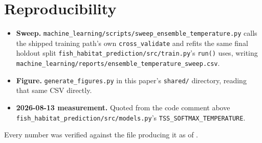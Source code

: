 \documentclass[conference]{IEEEtran}
\begin{document}
\section*{Reproducibility}
{\raggedright\sloppy
\begin{itemize}\itemsep1pt\parskip0pt
\item[] \textbf{Sweep.}
\texttt{machine\_learning/scripts/\allowbreak{}sweep\_ensemble\_temperature.py}
calls the shipped training path's own \texttt{cross\_validate} and refits
the same final holdout split
\texttt{fish\_habitat\_prediction/src/\allowbreak{}train.py}'s \texttt{run()}
uses, writing
\texttt{machine\_learning/reports/\allowbreak{}ensemble\_temperature\_sweep.csv}.
\item[] \textbf{Figure.} \texttt{generate\_figures.py} in this paper's
\texttt{shared/} directory, reading that same CSV directly.
\item[] \textbf{2026-08-13 measurement.} Quoted from the code comment above
\texttt{fish\_habitat\_prediction/src/\allowbreak{}models.py}'s
\texttt{TSS\_SOFTMAX\_TEMPERATURE}.
\end{itemize}}
Every number was verified against the file producing it as of \AsOf{}.



\end{document}
